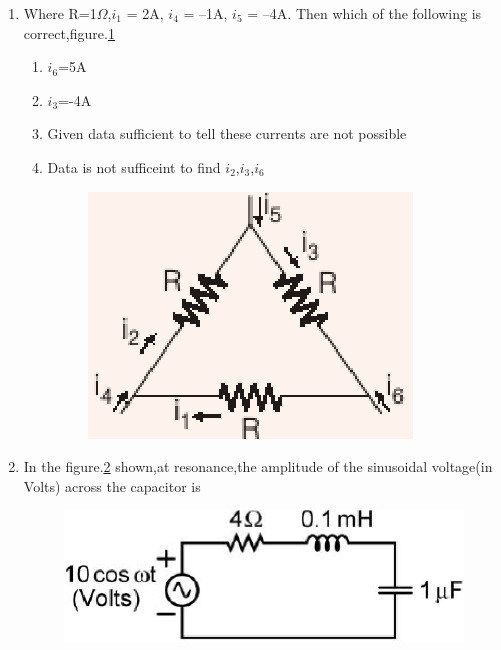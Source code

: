 \documentclass[journal,12pt,twocolumn]{IEEEtran}
\begin{document}
\begin{enumerate}
\item Where R=1$ \Omega $,$ i_{1} $ = 2A, $ i_{4} $ = –1A, $ i_{5} $ = –4A. Then which of the following is correct,figure.\ref{fig98}
\begin{enumerate}
\setlength\itemsep{2em}
\item $ i_{6} $=5A
\item $ i_{3} $=-4A
\item Given data sufficient to tell these currents are not possible
\item Data is not sufficeint to find $ i_{2} $,$ i_{3} $,$ i_{6} $
\begin{figure}[!h]
\begin{center}
\includegraphics[scale=0.7]{./figs/fig98.eps}
\caption{}
\label{fig98}
\end{center}
\end{figure}
\end{enumerate}


\item In the figure.\ref{fig99} shown,at resonance,the amplitude of the sinusoidal voltage(in Volts) across the capacitor is
\begin{figure}[!h]
\begin{center}
\includegraphics[scale=0.7]{./figs/fig99.eps}
\caption{}
\label{fig99}
\end{center}
\end{figure}


\end{enumerate}
\end{document}
